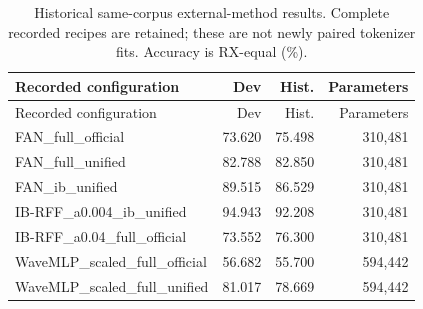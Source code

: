 \begin{longtable}{p{8.4cm}rrr}
\caption{Historical same-corpus external-method results. Complete recorded recipes are retained; these are not newly paired tokenizer fits. Accuracy is RX-equal (\%).}\\
\toprule Recorded configuration & Dev & Hist. & Parameters\\\midrule\endfirsthead
\toprule Recorded configuration & Dev & Hist. & Parameters\\\midrule\endhead
FAN\_full\_official & 73.620 & 75.498 & 310,481\\
FAN\_full\_unified & 82.788 & 82.850 & 310,481\\
FAN\_ib\_unified & 89.515 & 86.529 & 310,481\\
IB-RFF\_a0.004\_ib\_unified & 94.943 & 92.208 & 310,481\\
IB-RFF\_a0.04\_full\_official & 73.552 & 76.300 & 310,481\\
WaveMLP\_scaled\_full\_official & 56.682 & 55.700 & 594,442\\
WaveMLP\_scaled\_full\_unified & 81.017 & 78.669 & 594,442\\
\bottomrule\end{longtable}
